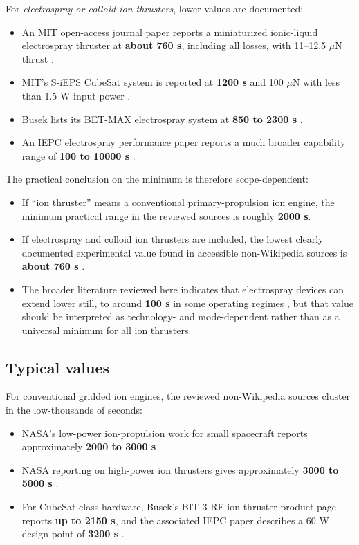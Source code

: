 \documentclass[11pt]{article}
\begin{document}
For \emph{electrospray or colloid ion thrusters}, lower values are documented:

\begin{itemize}
    \item An MIT open-access journal paper reports a miniaturized ionic-liquid electrospray thruster at \textbf{about 760 s}, including all losses, with 11--12.5 $\mu$N thrust \cite{krejci2017}.
    \item MIT's S-iEPS CubeSat system is reported at \textbf{1200 s} and 100 $\mu$N with less than 1.5 W input power \cite{mitsieps}.
    \item Busek lists its BET-MAX electrospray system at \textbf{850 to 2300 s} \cite{busek}.
    \item An IEPC electrospray performance paper reports a much broader capability range of \textbf{100 to 10000 s} \cite{iepc2009electrospray}.
\end{itemize}

The practical conclusion on the minimum is therefore scope-dependent:

\begin{itemize}
    \item If ``ion thruster'' means a conventional primary-propulsion ion engine, the minimum practical range in the reviewed sources is roughly \textbf{2000 s}. 
    \item If electrospray and colloid ion thrusters are included, the lowest clearly documented experimental value found in accessible non-Wikipedia sources is \textbf{about 760 s} \cite{krejci2017}.
    \item The broader literature reviewed here indicates that electrospray devices can extend lower still, to around \textbf{100 s} in some operating regimes \cite{iepc2009electrospray}, but that value should be interpreted as technology- and mode-dependent rather than as a universal minimum for all ion thrusters.
\end{itemize}

\subsection{Typical values}

For conventional gridded ion engines, the reviewed non-Wikipedia sources cluster in the low-thousands of seconds:

\begin{itemize}
    \item NASA's low-power ion-propulsion work for small spacecraft reports approximately \textbf{2000 to 3000 s} \cite{nasalowpower}.
    \item NASA reporting on high-power ion thrusters gives approximately \textbf{3000 to 5000 s} \cite{nasahighpower}.
    \item For CubeSat-class hardware, Busek's BIT-3 RF ion thruster product page reports \textbf{up to 2150 s}, and the associated IEPC paper describes a 60 W design point of \textbf{3200 s} \cite{bit3datasheet,bit3paper}.
\end{itemize}
\end{document}
